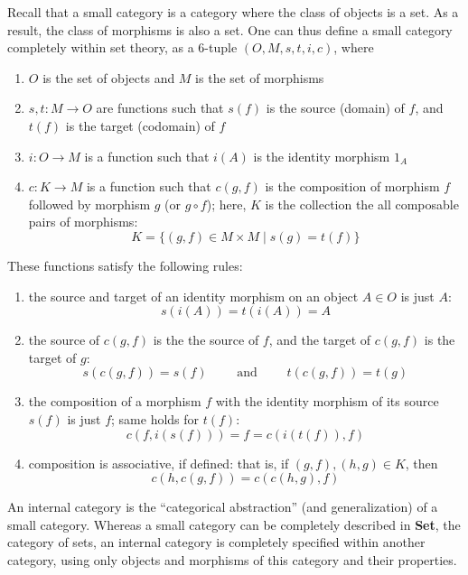 \documentclass[12pt]{article}
\begin{document}
Recall that a small category is a category where the class of objects is a set.  As a result, the class of morphisms is also a set.  One can thus define a small category completely within set theory, as a 6-tuple $(O,M,s,t,i,c)$, where
\begin{enumerate}
\item $O$ is the set of objects and $M$ is the set of morphisms
\item $s,t: M\to O$ are functions such that $s(f)$ is the source (domain) of $f$, and $t(f)$ is the target (codomain) of $f$
\item $i:O\to M$ is a function such that $i(A)$ is the identity morphism $1_A$
\item $c:K\to M$ is a function such that $c(g,f)$ is the composition of morphism $f$ followed by morphism $g$ (or $g\circ f$); here, $K$ is the collection the all composable pairs of morphisms: $$K=\lbrace (g,f)\in M\times M\mid s(g)=t(f)\rbrace$$
\end{enumerate}
These functions satisfy the following rules:
\begin{enumerate}
\item the source and target of an identity morphism on an object $A\in O$ is just $A$: $$s(i(A))=t(i(A))=A$$
\item the source of $c(g,f)$ is the the source of $f$, and the target of $c(g,f)$ is the target of $g$: $$s(c(g,f))=s(f)\qquad \mbox{ and }\qquad t(c(g,f))=t(g)$$
\item the composition of a morphism $f$ with the identity morphism of its source $s(f)$ is just $f$; same holds for $t(f)$: $$c(f,i(s(f)))=f=c(i(t(f)),f)$$
\item composition is associative, if defined: that is, if $(g,f),(h,g)\in K$, then $$c(h,c(g,f))=c(c(h,g),f)$$
\end{enumerate}

An internal category is the ``categorical abstraction'' (and generalization) of a small category.  Whereas a small category can be completely described in \textbf{Set}, the category of sets, an internal category is completely specified within another category, using only objects and morphisms of this category and their properties.
\end{document}
